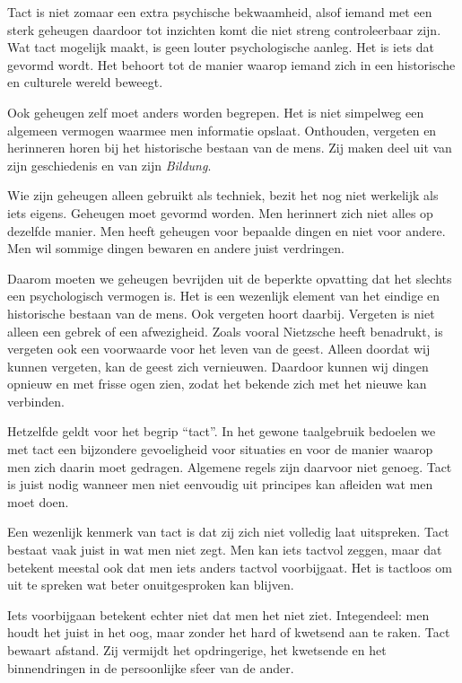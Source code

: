 Tact is niet zomaar een extra psychische bekwaamheid, alsof iemand met een sterk geheugen daardoor tot inzichten komt die niet streng controleerbaar zijn. Wat tact mogelijk maakt, is geen louter psychologische aanleg. Het is iets dat gevormd wordt. Het behoort tot de manier waarop iemand zich in een historische en culturele wereld beweegt.

Ook geheugen zelf moet anders worden begrepen. Het is niet simpelweg een algemeen vermogen waarmee men informatie opslaat. Onthouden, vergeten en herinneren horen bij het historische bestaan van de mens. Zij maken deel uit van zijn geschiedenis en van zijn \textit{Bildung}.

Wie zijn geheugen alleen gebruikt als techniek, bezit het nog niet werkelijk als iets eigens. Geheugen moet gevormd worden. Men herinnert zich niet alles op dezelfde manier. Men heeft geheugen voor bepaalde dingen en niet voor andere. Men wil sommige dingen bewaren en andere juist verdringen.

Daarom moeten we geheugen bevrijden uit de beperkte opvatting dat het slechts een psychologisch vermogen is. Het is een wezenlijk element van het eindige en historische bestaan van de mens. Ook vergeten hoort daarbij. Vergeten is niet alleen een gebrek of een afwezigheid. Zoals vooral Nietzsche heeft benadrukt, is vergeten ook een voorwaarde voor het leven van de geest. Alleen doordat wij kunnen vergeten, kan de geest zich vernieuwen. Daardoor kunnen wij dingen opnieuw en met frisse ogen zien, zodat het bekende zich met het nieuwe kan verbinden.

Hetzelfde geldt voor het begrip ``tact''. In het gewone taalgebruik bedoelen we met tact een bijzondere gevoeligheid voor situaties en voor de manier waarop men zich daarin moet gedragen. Algemene regels zijn daarvoor niet genoeg. Tact is juist nodig wanneer men niet eenvoudig uit principes kan afleiden wat men moet doen.

Een wezenlijk kenmerk van tact is dat zij zich niet volledig laat uitspreken. Tact bestaat vaak juist in wat men niet zegt. Men kan iets tactvol zeggen, maar dat betekent meestal ook dat men iets anders tactvol voorbijgaat. Het is tactloos om uit te spreken wat beter onuitgesproken kan blijven.

Iets voorbijgaan betekent echter niet dat men het niet ziet. Integendeel: men houdt het juist in het oog, maar zonder het hard of kwetsend aan te raken. Tact bewaart afstand. Zij vermijdt het opdringerige, het kwetsende en het binnendringen in de persoonlijke sfeer van de ander.


